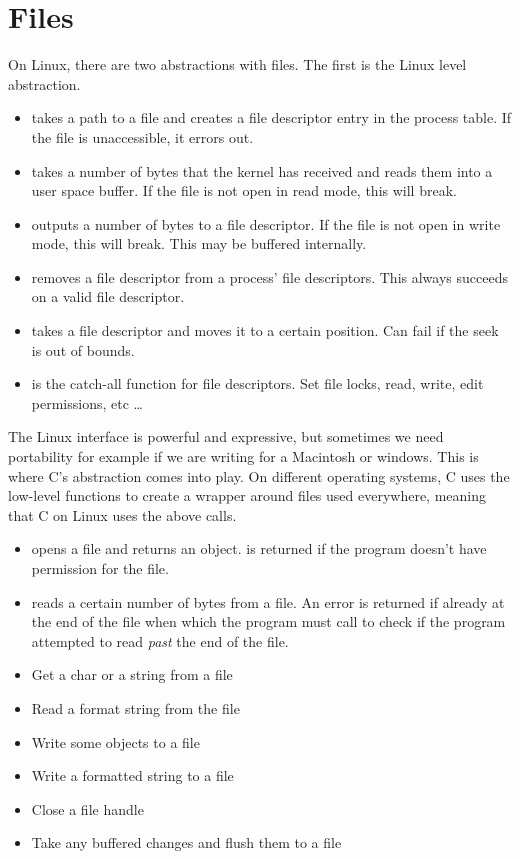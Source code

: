 \section{Files}

On Linux, there are two abstractions with files. The first is the Linux  level abstraction.

 \begin{itemize}
\item {} takes a path to a file and creates a file descriptor entry in the process table. If the file is unaccessible, it errors out.
\item {} takes a number of bytes that the kernel has received and reads them into a user space buffer. If the file is not open in read mode, this will break.
\item {} outputs a number of bytes to a file descriptor. If the file is not open in write mode, this will break. This may be buffered internally.
\item {} removes a file descriptor from a process' file descriptors. This always succeeds on a valid file descriptor.
\item {} takes a file descriptor and moves it to a certain position. Can fail if the seek is out of bounds.
\item {} is the catch-all function for file descriptors. Set file locks, read, write, edit permissions, etc \ldots{}
 \end{itemize}

The Linux interface is powerful and expressive, but sometimes we need portability for example if we are writing for a Macintosh or windows.
This is where C's abstraction comes into play.
On different operating systems, C uses the low-level functions to create a wrapper around files used everywhere, meaning that C on Linux uses the above calls.

\begin{itemize}
\item {} opens a file and returns an object.  is returned if the program doesn't have permission for the file.
\item {} reads a certain number of bytes from a file. An error is returned if already at the end of the file when which the program must call  to check if the program attempted to read \textit{past} the end of the file.
\item {} Get a char or a string from a file
\item {} Read a format string from the file
\item {} Write some objects to a file
\item {} Write a formatted string to a file
\item {} Close a file handle
\item {} Take any buffered changes and flush them to a file
\end{itemize}

